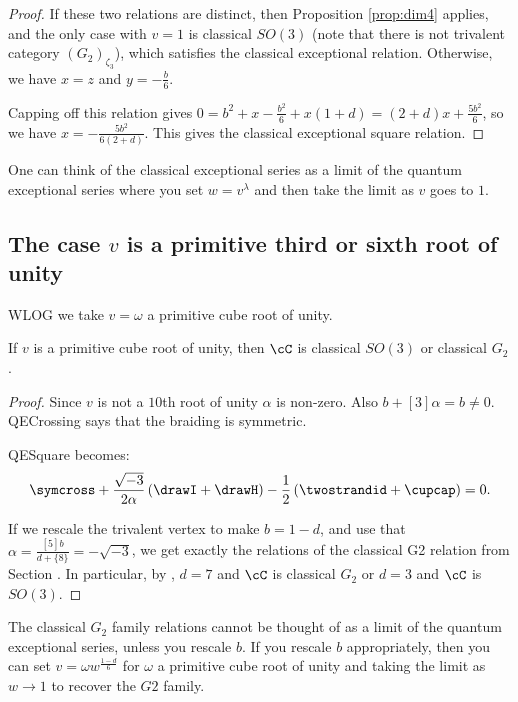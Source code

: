 \documentclass[12pt]{amsart}
\begin{document}
\begin{proof}
If these two relations are distinct, then Proposition \ref{prop:dim4} applies, and the only case with $v=1$ is classical $SO(3)$ (note that there is not trivalent category $(G_2)_{\zeta_3}$), which satisfies the classical exceptional relation.  Otherwise, we have $x=z$ and $y = -\frac{b}{6}$.  

Capping off this relation gives $0 = b^2 + x -\frac{b^2}{6}+x(1+d) =  (2+d)x +\frac{5 b^2}{6}$, so we have $x = -\frac{5 b^2}{6(2+d)}$.  This gives the classical exceptional square relation.
\end{proof}

\begin{remark}
One can think of the classical exceptional series as a limit of the quantum exceptional series where you set $w = v^\lambda$ and then take the limit as $v$ goes to $1$.
\end{remark}

\subsection{The case \texorpdfstring{$v$}{v} is a primitive third or sixth root of unity}

WLOG we take $v = \omega$ a primitive cube root of unity.

\begin{proposition}
If $v$ is a primitive cube root of unity, then $\cC$ is classical $SO(3)$ or classical $G_2$.
\end{proposition}
\begin{proof}
Since $v$ is not a $10$th root of unity $\alpha$ is non-zero.  Also $b+[3]\alpha = b \neq 0$.  QECrossing says that the braiding is symmetric.  

QESquare becomes:
$$\symcross+\frac{\sqrt{-3}}{2\alpha} \left(\drawI + \drawH \right) -\frac{1}{2} \left(\twostrandid + \cupcap \right) = 0.$$

If we rescale the trivalent vertex to make $b= 1-d$, and use that $\alpha = \frac{[5] b}{d+\{8\}} = -\sqrt{-3}$, we get exactly the relations of the classical G2 relation from Section \cite{???}.  In particular, by \cite{1011.6197}, $d = 7$ and $\cC$ is classical $G_2$ or $d=3$ and $\cC$ is $SO(3)$.
\end{proof}

\begin{remark}
The classical $G_2$ family relations cannot be thought of as a limit of the quantum exceptional series, unless you rescale $b$.  If you rescale $b$ appropriately, then you can set $v = \omega w^{\frac{1-d}{6}}$ for $\omega$ a primitive cube root of unity and taking the limit as $w \rightarrow 1$ to recover the $G2$ family.
\end{remark}
\end{document}
